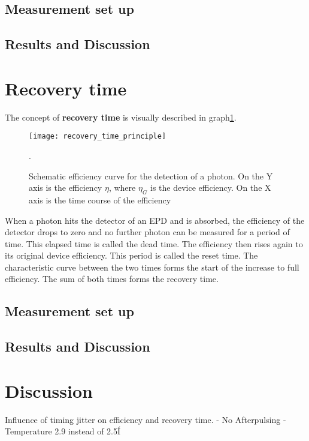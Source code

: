 \subsection*{Measurement set up}
\subsection*{Results and Discussion}
\section{Recovery time}
The concept of \textbf{recovery time} is visually described in graph\ref{fig:Recovery_time}. \\
\begin{figure}[hhh]
\texttt{[image: recovery\_time\_principle]}
\caption{Schematic efficiency curve for the detection of a photon\cite{shalm_single-photon_2013}. On the Y axis is the
efficiency $\eta$, where $\eta_{G}$ is the device efficiency. On the X axis is the time course of the efficiency}.
\label{fig:Recovery_time}
\end{figure}

When a photon hits the detector of an EPD and is absorbed, the efficiency of the detector drops to zero and no further
photon can be measured for a period of time.
This elapsed time is called the dead time.
The efficiency then rises again to its original device efficiency.
This period is called the reset time.
The characteristic curve between the two times forms the start of the increase to full efficiency.
The sum of both times forms the recovery time.

\subsection*{Measurement set up}

\subsection*{Results and Discussion}
\section{Discussion}
Influence of timing jitter on efficiency and recovery time.
- No Afterpulsing
- Temperature 2.9 instead of 2.5Í